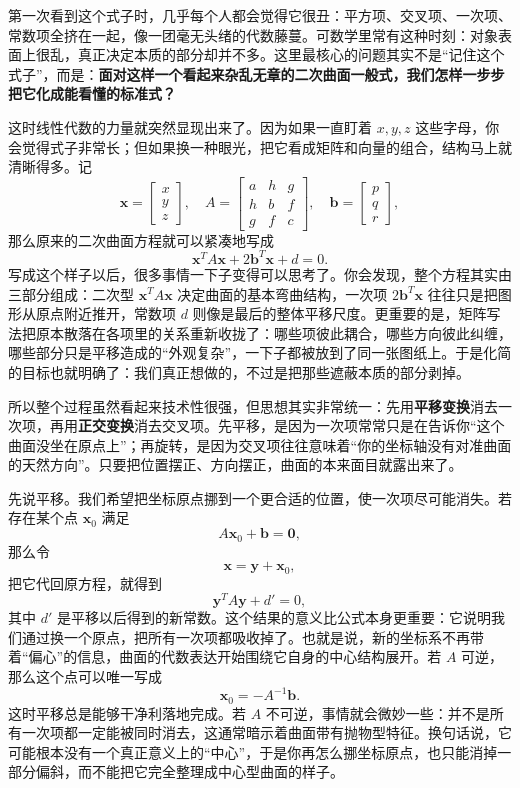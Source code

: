 \documentclass[UTF8]{ctexbook}
\begin{document}
第一次看到这个式子时，几乎每个人都会觉得它很丑：平方项、交叉项、一次项、常数项全挤在一起，像一团毫无头绪的代数藤蔓。可数学里常有这种时刻：对象表面上很乱，真正决定本质的部分却并不多。这里最核心的问题其实不是“记住这个式子”，而是：\textbf{面对这样一个看起来杂乱无章的二次曲面一般式，我们怎样一步步把它化成能看懂的标准式？}

这时线性代数的力量就突然显现出来了。因为如果一直盯着 $x,y,z$ 这些字母，你会觉得式子非常长；但如果换一种眼光，把它看成矩阵和向量的组合，结构马上就清晰得多。记
\[
\mathbf{x}=\begin{bmatrix}x\\y\\z\end{bmatrix},\quad
A=\begin{bmatrix}
a & h & g\\
h & b & f\\
g & f & c
\end{bmatrix},\quad
\mathbf{b}=\begin{bmatrix}p\\q\\r\end{bmatrix},
\]
那么原来的二次曲面方程就可以紧凑地写成
\[
\mathbf{x}^T A\mathbf{x}+2\mathbf{b}^T\mathbf{x}+d=0.
\]
写成这个样子以后，很多事情一下子变得可以思考了。你会发现，整个方程其实由三部分组成：二次型 $\mathbf{x}^TA\mathbf{x}$ 决定曲面的基本弯曲结构，一次项 $2\mathbf{b}^T\mathbf{x}$ 往往只是把图形从原点附近推开，常数项 $d$ 则像是最后的整体平移尺度。更重要的是，矩阵写法把原本散落在各项里的关系重新收拢了：哪些项彼此耦合，哪些方向彼此纠缠，哪些部分只是平移造成的“外观复杂”，一下子都被放到了同一张图纸上。于是化简的目标也就明确了：我们真正想做的，不过是把那些遮蔽本质的部分剥掉。

所以整个过程虽然看起来技术性很强，但思想其实非常统一：先用\textbf{平移变换}消去一次项，再用\textbf{正交变换}消去交叉项。先平移，是因为一次项常常只是在告诉你“这个曲面没坐在原点上”；再旋转，是因为交叉项往往意味着“你的坐标轴没有对准曲面的天然方向”。只要把位置摆正、方向摆正，曲面的本来面目就露出来了。

先说平移。我们希望把坐标原点挪到一个更合适的位置，使一次项尽可能消失。若存在某个点 $\mathbf{x}_0$ 满足
\[
A\mathbf{x}_0+\mathbf{b}=\mathbf{0},
\]
那么令
\[
\mathbf{x}=\mathbf{y}+\mathbf{x}_0,
\]
把它代回原方程，就得到
\[
\mathbf{y}^T A\mathbf{y}+d'=0,
\]
其中 $d'$ 是平移以后得到的新常数。这个结果的意义比公式本身更重要：它说明我们通过换一个原点，把所有一次项都吸收掉了。也就是说，新的坐标系不再带着“偏心”的信息，曲面的代数表达开始围绕它自身的中心结构展开。若 $A$ 可逆，那么这个点可以唯一写成
\[
\mathbf{x}_0=-A^{-1}\mathbf{b}.
\]
这时平移总是能够干净利落地完成。若 $A$ 不可逆，事情就会微妙一些：并不是所有一次项都一定能被同时消去，这通常暗示着曲面带有抛物型特征。换句话说，它可能根本没有一个真正意义上的“中心”，于是你再怎么挪坐标原点，也只能消掉一部分偏斜，而不能把它完全整理成中心型曲面的样子。
\end{document}
